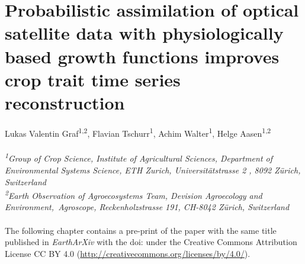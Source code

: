 \chapter{Probabilistic assimilation of optical satellite data with physiologically based growth functions improves crop trait time series reconstruction}
\label{chap:drc}
\graphicspath{{./06-DRC/img}}

Lukas Valentin Graf\textsuperscript{1,2}, Flavian Tschurr\textsuperscript{1}, Achim Walter\textsuperscript{1}, Helge Aasen\textsuperscript{1,2}
\\
\normalsize
\vspace{2pt}
\\
\textit{\textsuperscript{1}Group of Crop Science, Institute of Agricultural Sciences, Department of Environmental Systems Science, ETH Zurich, Universitätstrasse 2 , 8092 Zürich, Switzerland
\\
\textsuperscript{2}Earth Observation of Agroecosystems Team, Devision Agroecology and Environment,\ Agroscope, Reckenholzstrasse 191, CH-8042 Zürich, Switzerland
\\
\vspace{2cm}}
\\

The following chapter contains a pre-print of the paper with the same title published in \textsl{EarthArXiv} with the doi:  under the Creative Commons Attribution License CC BY 4.0 (\url{http://creativecommons.org/licenses/by/4.0/}).
\pagebreak
